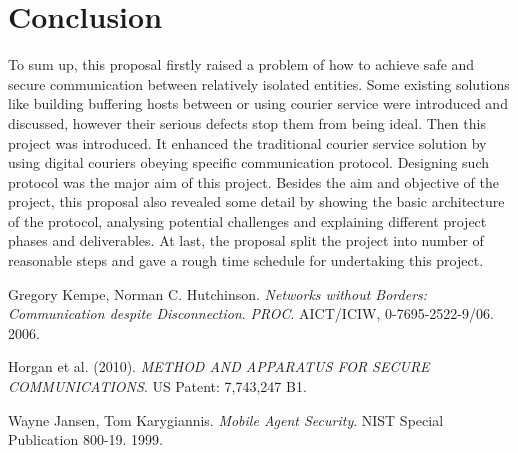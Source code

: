 \documentclass[11pt,a4paper]{article}
\begin{document}
\section{Conclusion}
To sum up, this proposal firstly raised a problem of how to achieve safe and secure communication between relatively isolated entities. Some existing solutions like building buffering hosts between or using courier service were introduced and discussed, however their serious defects stop them from being ideal. Then this project was introduced. It enhanced the traditional courier service solution by using digital couriers obeying specific communication protocol. Designing such protocol was the major aim of this project. Besides the aim and objective of the project, this proposal also revealed some detail by showing the basic architecture of the protocol, analysing potential challenges and explaining different project phases and deliverables. At last, the proposal split the project into number of reasonable steps and gave a rough time schedule for undertaking this project. 


\begin{thebibliography}{9}
  Gregory Kempe, Norman C. Hutchinson.
  \emph{Networks without Borders: Communication despite Disconnection}.
  \emph{PROC}. AICT/ICIW, 0-7695-2522-9/06.
  2006.


  Horgan et al. (2010).
  \emph{METHOD AND APPARATUS FOR SECURE COMMUNICATIONS}.
  US Patent: 7,743,247 B1.

  Wayne Jansen, Tom Karygiannis.
  \emph{Mobile Agent Security}.
  NIST Special Publication 800-19.
  1999.
  

\end{thebibliography}
\end{document}
